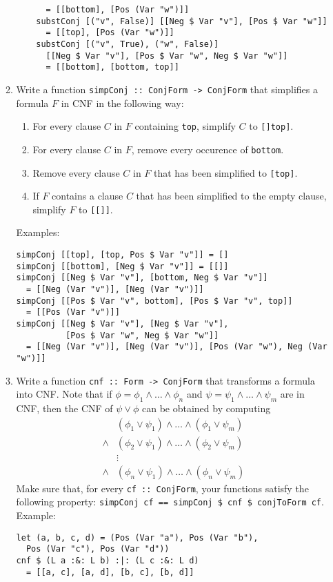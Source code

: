 \documentclass{article}
\def\code#1{\texttt{#1}}
\begin{document}
\begin{enumerate}
\begin{enumerate}
\begin{verbatim}
      = [[bottom], [Pos (Var "w")]]
    substConj [("v", False)] [[Neg $ Var "v"], [Pos $ Var "w"]]
      = [[top], [Pos (Var "w")]]
    substConj [("v", True), ("w", False)]
      [[Neg $ Var "v"], [Pos $ Var "w", Neg $ Var "w"]]
      = [[bottom], [bottom, top]]
                \end{verbatim}
            \item Write a function \code{simpConj :: ConjForm -> ConjForm} that simplifies a formula $F$ in CNF in the following way:
                \begin{enumerate}
                    \item For every clause $C$ in $F$ containing \code{top}, simplify $C$ to \code{[]top]}.
                    \item For every clause $C$ in $F$, remove every occurence of \code{bottom}.
                    \item Remove every clause $C$ in $F$ that has been simplified to \code{[top]}.
                    \item If $F$ contains a clause $C$ that has been simplified to the empty clause, simplify $F$ to \code{[[]]}.
                \end{enumerate}
                Examples:
                \begin{verbatim}
simpConj [[top], [top, Pos $ Var "v"]] = []
simpConj [[bottom], [Neg $ Var "v"]] = [[]]
simpConj [[Neg $ Var "v"], [bottom, Neg $ Var "v"]]
  = [[Neg (Var "v")], [Neg (Var "v")]]
simpConj [[Pos $ Var "v", bottom], [Pos $ Var "v", top]]
  = [[Pos (Var "v")]]
simpConj [[Neg $ Var "v"], [Neg $ Var "v"],
          [Pos $ Var "w", Neg $ Var "w"]]
  = [[Neg (Var "v")], [Neg (Var "v")], [Pos (Var "w"), Neg (Var "w")]]
                \end{verbatim}
            \item Write a function \code{cnf :: Form -> ConjForm} that transforms a formula into CNF. Note that if $\phi = \phi_1 \land \dots \land \phi_n$ and $\psi = \psi_1 \land \dots \land \psi_m$ are in CNF, then the CNF of $\psi \lor \phi$ can be obtained by computing
                \begin{align*}
                          & (\phi_1 \lor \psi_1) \land \dots \land (\phi_1 \lor \psi_m) \\
                    \land & (\phi_2 \lor \psi_1) \land \dots \land (\phi_2 \lor \psi_m) \\
                          & \vdots \\
                    \land & (\phi_n \lor \psi_1) \land \dots \land (\phi_n \lor \psi_m)
                \end{align*}
                Make sure that, for every \code{cf :: ConjForm}, your functions satisfy the following property: \code{simpConj cf == simpConj \$ cnf \$ conjToForm cf}. Example:
                \begin{verbatim}
let (a, b, c, d) = (Pos (Var "a"), Pos (Var "b"),
  Pos (Var "c"), Pos (Var "d"))
cnf $ (L a :&: L b) :|: (L c :&: L d)
  = [[a, c], [a, d], [b, c], [b, d]]
                \end{verbatim}
        \end{enumerate}


\end{enumerate}
\end{document}
